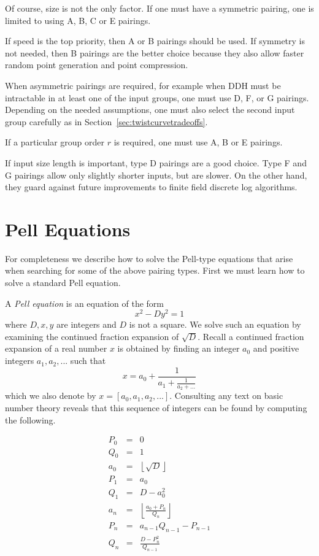 Of course, size is not the only factor. If one must have
a symmetric pairing, one is limited to using A, B, C or E pairings.

If speed is the top priority, then A or B pairings should be used. If symmetry
is not needed, then B pairings are the better choice because
they also allow faster random point generation and point compression.

When asymmetric pairings are required, for example when DDH must be intractable
in at least one of the input groups, one must use D, F, or G pairings.
Depending on the needed assumptions, one must also select the second input
group carefully as in Section~\ref{sec:twistcurvetradeoffs}.

If a particular group order $r$ is required, one must use A, B or E pairings.

If input size length is important, type D pairings are a good choice.
Type F and G pairings allow only slightly shorter inputs, but are slower.
On the other hand, they guard against future improvements to
finite field discrete log algorithms.

\section{\label{sec:pelleqn}Pell Equations}

For completeness we describe how to solve the Pell-type equations that arise
when searching for some of the above pairing types. First we must learn
how to solve a standard Pell equation.

A \emph{Pell equation} is an equation of the form
\[ x^2 - D y^2 = 1 \]
where $D, x, y$ are integers and $D$ is not a square.
We solve such an equation by examining the
continued fraction expansion of $\sqrt{D}$.
Recall a continued fraction expansion of a real number $x$
is obtained by finding
an integer $a_0$ and positive integers $a_1, a_2, ...$ such that
\[
x = a_0 + \frac{1}{a_1 + \frac{1}{a_2 + ...}}
\]
which we also denote by $x = [a_0,a_1,a_2,...]$.
Consulting any text on basic number theory reveals that
this sequence of integers can be found by computing the following.

\[
\begin{array}{rcl}
P_0 &=& 0 \\
Q_0 &=& 1 \\
a_0 &=& \left\lfloor{\sqrt{D}}\right\rfloor \\
P_1 &=& a_0 \\
Q_1 &=& D-a_0^2 \\
a_n &=& \left\lfloor { \frac {a_0 + P_n}{Q_n} } \right\rfloor \\
P_n &=& a_{n-1} Q_{n-1} - P_{n-1} \\
Q_n &=& \frac{D - P_n^2}{Q_{n-1}}
\end{array}
\]

